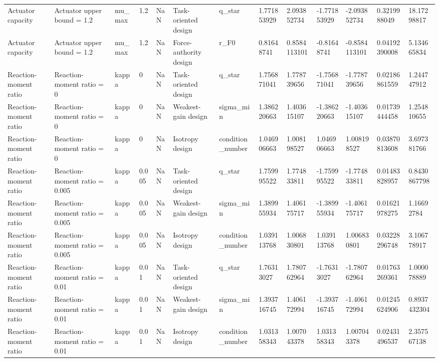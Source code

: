 \begin{tabular}{@{}lllllllllllll@{}}
Actuator capacity & Actuator upper bound = 1.2 & mu\_max & 1.2 & NaN & Task-oriented design & q\_star & 1.771853929 & 2.093852734 & -1.771853929 & -2.093852734 & 0.3219988049 & 18.17298817 \\
Actuator capacity & Actuator upper bound = 1.2 & mu\_max & 1.2 & NaN & Force-authority design & r\_F0 & 0.81648741 & 0.8584113101 & -0.81648741 & -0.8584113101 & 0.04192390008 & 5.134665834 \\
Reaction-moment ratio & Reaction-moment ratio = 0 & kappa & 0 & NaN & Task-oriented design & q\_star & 1.756871041 & 1.778739656 & -1.756871041 & -1.778739656 & 0.02186861559 & 1.244747912 \\
Reaction-moment ratio & Reaction-moment ratio = 0 & kappa & 0 & NaN & Weakest-gain design & sigma\_min & 1.386220663 & 1.403615107 & -1.386220663 & -1.403615107 & 0.01739444458 & 1.254810655 \\
Reaction-moment ratio & Reaction-moment ratio = 0 & kappa & 0 & NaN & Isotropy design & condition\_number & 1.046906663 & 1.008198527 & 1.046906663 & 1.008198527 & 0.03870813608 & 3.697381766 \\
Reaction-moment ratio & Reaction-moment ratio = 0.005 & kappa & 0.005 & NaN & Task-oriented design & q\_star & 1.759995522 & 1.774833811 & -1.759995522 & -1.774833811 & 0.01483828957 & 0.8430867798 \\
Reaction-moment ratio & Reaction-moment ratio = 0.005 & kappa & 0.005 & NaN & Weakest-gain design & sigma\_min & 1.389955934 & 1.406175717 & -1.389955934 & -1.406175717 & 0.01621978275 & 1.16692784 \\
Reaction-moment ratio & Reaction-moment ratio = 0.005 & kappa & 0.005 & NaN & Isotropy design & condition\_number & 1.039113768 & 1.006830801 & 1.039113768 & 1.006830801 & 0.03228296748 & 3.106778917 \\
Reaction-moment ratio & Reaction-moment ratio = 0.01 & kappa & 0.01 & NaN & Task-oriented design & q\_star & 1.76313027 & 1.780762964 & -1.76313027 & -1.780762964 & 0.01763269361 & 1.000078889 \\
Reaction-moment ratio & Reaction-moment ratio = 0.01 & kappa & 0.01 & NaN & Weakest-gain design & sigma\_min & 1.393716745 & 1.406172994 & -1.393716745 & -1.406172994 & 0.01245624906 & 0.8937432304 \\
Reaction-moment ratio & Reaction-moment ratio = 0.01 & kappa & 0.01 & NaN & Isotropy design & condition\_number & 1.031358343 & 1.007043378 & 1.031358343 & 1.007043378 & 0.02431496537 & 2.357567138 \\

\end{tabular}
